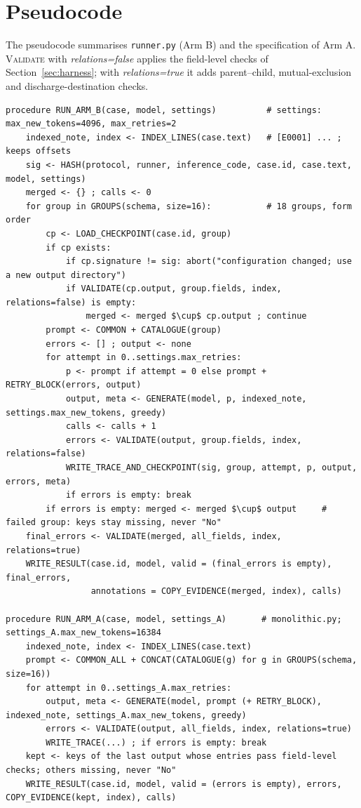 \section{Pseudocode}\label{app:pseudocode}

The pseudocode summarises \texttt{runner.py} (Arm B) and the specification of Arm A. \textsc{Validate} with
\emph{relations=false} applies the field-level checks of Section~\ref{sec:harness}; with \emph{relations=true} it adds
parent--child, mutual-exclusion and discharge-destination checks.

\begin{lstlisting}[mathescape=true]
procedure RUN_ARM_B(case, model, settings)          # settings: max_new_tokens=4096, max_retries=2
    indexed_note, index <- INDEX_LINES(case.text)   # [E0001] ... ; keeps offsets
    sig <- HASH(protocol, runner, inference_code, case.id, case.text, model, settings)
    merged <- {} ; calls <- 0
    for group in GROUPS(schema, size=16):           # 18 groups, form order
        cp <- LOAD_CHECKPOINT(case.id, group)
        if cp exists:
            if cp.signature != sig: abort("configuration changed; use a new output directory")
            if VALIDATE(cp.output, group.fields, index, relations=false) is empty:
                merged <- merged $\cup$ cp.output ; continue
        prompt <- COMMON + CATALOGUE(group)
        errors <- [] ; output <- none
        for attempt in 0..settings.max_retries:
            p <- prompt if attempt = 0 else prompt + RETRY_BLOCK(errors, output)
            output, meta <- GENERATE(model, p, indexed_note, settings.max_new_tokens, greedy)
            calls <- calls + 1
            errors <- VALIDATE(output, group.fields, index, relations=false)
            WRITE_TRACE_AND_CHECKPOINT(sig, group, attempt, p, output, errors, meta)
            if errors is empty: break
        if errors is empty: merged <- merged $\cup$ output     # failed group: keys stay missing, never "No"
    final_errors <- VALIDATE(merged, all_fields, index, relations=true)
    WRITE_RESULT(case.id, model, valid = (final_errors is empty), final_errors,
                 annotations = COPY_EVIDENCE(merged, index), calls)

procedure RUN_ARM_A(case, model, settings_A)       # monolithic.py; settings_A.max_new_tokens=16384
    indexed_note, index <- INDEX_LINES(case.text)
    prompt <- COMMON_ALL + CONCAT(CATALOGUE(g) for g in GROUPS(schema, size=16))
    for attempt in 0..settings_A.max_retries:
        output, meta <- GENERATE(model, prompt (+ RETRY_BLOCK), indexed_note, settings_A.max_new_tokens, greedy)
        errors <- VALIDATE(output, all_fields, index, relations=true)
        WRITE_TRACE(...) ; if errors is empty: break
    kept <- keys of the last output whose entries pass field-level checks; others missing, never "No"
    WRITE_RESULT(case.id, model, valid = (errors is empty), errors, COPY_EVIDENCE(kept, index), calls)


\end{lstlisting}
